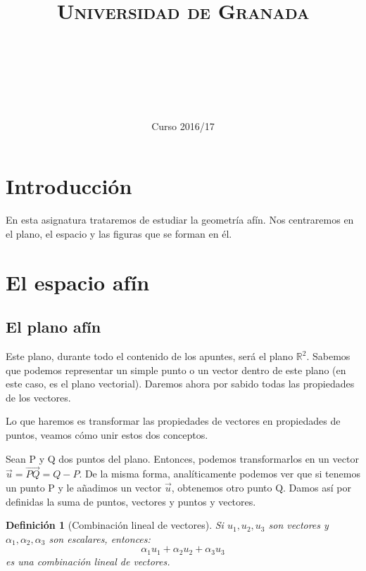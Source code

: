 \documentclass[11pt, a4paper, titlepage]{article}
\title{
  \normalfont \normalsize 
  \textsc{Universidad de Granada} \\ [25pt]    %
  \horrule{0.5pt} \\[0.4cm] %
  \huge \subject\\ %
  \horrule{2pt} \\[0.5cm] %
}
\author{\Large{\docauthor}}
\date{\vspace{-1.5em} \normalsize Curso 2016/17}
\newcommand{\R}{\mathbb{R}}
\theoremstyle{theorem-style}
\theoremstyle{definition-style}
\newtheorem*{ndef}{Definición}
\theoremstyle{remark-style}
\theoremstyle{example-style}
\begin{document}
\maketitle  %
\tableofcontents    %
\newpage



\section*{Introducción}
En esta asignatura trataremos de estudiar la geometría afín. Nos centraremos en el plano, el espacio y las figuras que se forman en él.
\newpage

\section{El espacio afín}

\subsection{El plano afín}
Este plano, durante todo el contenido de los apuntes, será el plano $\R^2$. Sabemos que podemos representar un simple punto o un vector dentro de este plano (en este caso, es el plano vectorial). Daremos ahora por sabido todas las propiedades de los vectores.


Lo que haremos es transformar las propiedades de vectores en propiedades de puntos, veamos cómo unir estos dos conceptos.

Sean P y Q dos puntos del plano. Entonces, podemos transformarlos en un vector $\vec{u} = \overrightarrow{PQ} = Q-P$. De la misma forma, analíticamente podemos ver que si tenemos un punto P y le añadimos un vector $\vec{u}$, obtenemos otro punto Q. Damos así por definidas la suma de puntos, vectores y puntos y vectores.

\begin{ndef}[Combinación lineal de vectores]
	Si $u_1,u_2,u_3$ son vectores y $\alpha_1,\alpha_2,\alpha_3$ son escalares, entonces:
	\[
	\alpha_1 u_1+ \alpha_2 u_2 + \alpha_3 u_3
	\]
	es una combinación lineal de vectores.
\end{ndef}
\end{document}

